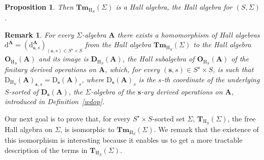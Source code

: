 \documentclass{amsart}
\newcommand{\vs}[1]{\mathbin{\downarrow}#1}
\theoremstyle{plain}
\newtheorem{proposition}[theorem]{Proposition}
\newtheorem{remark}[theorem]{Remark}
\theoremstyle{definition}
\begin{document}
\begin{proposition}
	Then $\mathbf{Tm}_{\mathrm{H}_{S}}(\Sigma)$ is a Hall algebra, the \emph{Hall algebra for} $(S,\Sigma)$.
\end{proposition}

\begin{remark}
	For every $\Sigma$-algebra $\mathbf{A}$ there exists a homomorphism of Hall algebras $\mathrm{d}^{\mathbf{A}} = (\mathrm{d}^{\mathbf{A}}_{\mathbf{\mathbf{s}},s})_{(\mathbf{\mathbf{s}},s)\in S^{\star}\times S}$ from the Hall algebra $\mathbf{Tm}_{\mathrm{H}_{S}}(\Sigma)$ to the Hall algebra $\mathbf{O}_{\mathrm{H}_{S}}(\mathbf{A})$ and its image is $\mathbf{D}_{\mathrm{H}_{S}}(\mathbf{A})$, the Hall subalgebra of $\mathbf{O}_{\mathrm{H}_{S}}(\mathbf{A})$ of the finitary derived operations on $\mathbf{A}$, which, for every $(\mathbf{\mathbf{s}},s)\in S^{\star}\times S$, is such that 
	$\mathrm{D}_{\mathrm{H}_{S}}(\mathbf{A})_{\mathbf{\mathbf{s}},s} = 
	\mathrm{D}_{\mathbf{\mathbf{s}}}(\mathbf{A})_{s}$, where $\mathrm{D}_{\mathbf{\mathbf{s}}}(\mathbf{A})_{s}$ is the $s$-th coordinate of the underlying $S$-sorted of 
	$\mathbf{D}_{\mathbf{\mathbf{s}}}(\mathbf{A})$, the $\Sigma$-algebra of the $\mathbf{\mathbf{s}}$-\emph{ary} derived operations on $\mathbf{A}$, introduced in Definition~\ref{wdop}.
\end{remark}



Our next goal is to prove that, for every $S^{\star}\times S$-sorted set $\Sigma$, $\mathbf{T}_{\mathrm{H}_{S}}(\Sigma)$, the free Hall algebra on $\Sigma$, is isomorphic to $\mathbf{Tm}_{\mathrm{H}_{S}}(\Sigma)$. We remark that the existence of this isomorphism is interesting because it enables us to get a more tractable description of the terms in $\mathbf{T}_{\mathrm{H}_{S}}(\Sigma)$.
\end{document}
